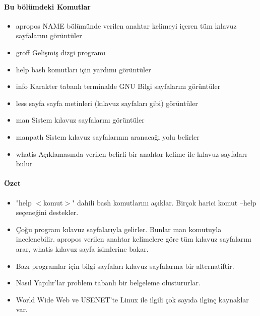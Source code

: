 \paragraph{Bu bölümdeki Komutlar}{
\begin{itemize}
\item apropos 	NAME bölümünde verilen anahtar kelimeyi içeren tüm kılavuz sayfalarını görüntüler
\item groff		Gelişmiş dizgi programı
\item help 		bash komutları için yardımı görüntüler
\item info 		Karakter tabanlı terminalde GNU Bilgi sayfalarını görüntüler
\item less		sayfa sayfa metinleri (kılavuz sayfaları gibi) görüntüler
\item man		Sistem kılavuz sayfalarını görüntüler
\item manpath		Sistem kılavuz sayfalarının aranacağı yolu belirler
\item whatis		Açıklamasında verilen belirli bir anahtar kelime ile kılavuz sayfaları bulur
\end{itemize}}
\paragraph{Özet}{
\begin{itemize}
\item "help $<$komut$>$" dahili bash komutlarını açıklar. Birçok harici komut --help seçeneğini destekler.
\item Çoğu program kılavuz sayfalarıyla gelirler. Bunlar man komutuyla incelenebilir. apropos verilen anahtar kelimelere göre tüm kılavuz sayfalarını arar, whatis kılavuz sayfa isimlerine bakar.
\item Bazı programlar için bilgi sayfaları kılavuz sayfalarına bir alternatiftir.
\item Nasıl Yapılır'lar problem tabanlı bir belgeleme olustururlar.
\item World Wide Web ve USENET'te Linux ile ilgili çok sayıda ilginç kaynaklar var.
\end{itemize}}